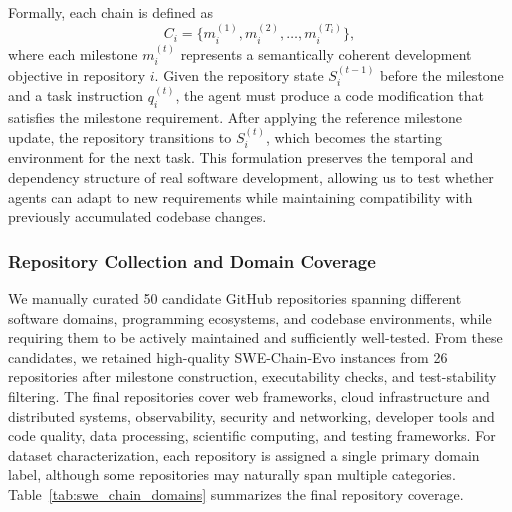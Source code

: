 \documentclass{article}
\begin{document}
Formally, each chain is defined as
\[
C_i = \{m_i^{(1)}, m_i^{(2)}, \ldots, m_i^{(T_i)}\},
\]
where each milestone \(m_i^{(t)}\) represents a semantically coherent development objective in repository \(i\). Given the repository state \(S_i^{(t-1)}\) before the milestone and a task instruction \(q_i^{(t)}\), the agent must produce a code modification that satisfies the milestone requirement. After applying the reference milestone update, the repository transitions to \(S_i^{(t)}\), which becomes the starting environment for the next task. This formulation preserves the temporal and dependency structure of real software development, allowing us to test whether agents can adapt to new requirements while maintaining compatibility with previously accumulated codebase changes.

\subsubsection{Repository Collection and Domain Coverage}
\label{app:swe_repository_collection}
We manually curated 50 candidate GitHub repositories spanning different software domains, programming ecosystems, and codebase environments, while requiring them to be actively maintained and sufficiently well-tested. From these candidates, we retained high-quality SWE-Chain-Evo instances from 26 repositories after milestone construction, executability checks, and test-stability filtering. The final repositories cover web frameworks, cloud infrastructure and distributed systems, observability, security and networking, developer tools and code quality, data processing, scientific computing, and testing frameworks. For dataset characterization, each repository is assigned a single primary domain label, although some repositories may naturally span multiple categories. Table~\ref{tab:swe_chain_domains} summarizes the final repository coverage.
\end{document}

